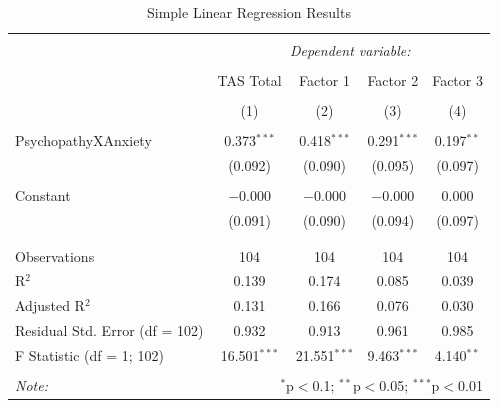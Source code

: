 \documentclass[
  man,floatsintext]{apa7}
\begin{document}
\begin{table}[!htbp] \centering 
  \caption{Simple Linear Regression Results} 
  \label{tab:simple-regression-output} 
\begin{tabular}{@{\extracolsep{1pt}}lcccc} 
\\[-1.8ex]\hline 
\hline \\[-1.8ex] 
 & \multicolumn{4}{c}{\textit{Dependent variable:}} \\ 
\cline{2-5} 
\\[-1.8ex] & TAS Total & Factor 1 & Factor 2 & Factor 3 \\ 
\\[-1.8ex] & (1) & (2) & (3) & (4)\\ 
\hline \\[-1.8ex] 
 PsychopathyXAnxiety & 0.373$^{***}$ & 0.418$^{***}$ & 0.291$^{***}$ & 0.197$^{**}$ \\ 
  & (0.092) & (0.090) & (0.095) & (0.097) \\ 
  & & & & \\ 
 Constant & $-$0.000 & $-$0.000 & $-$0.000 & 0.000 \\ 
  & (0.091) & (0.090) & (0.094) & (0.097) \\ 
  & & & & \\ 
\hline \\[-1.8ex] 
Observations & 104 & 104 & 104 & 104 \\ 
R$^{2}$ & 0.139 & 0.174 & 0.085 & 0.039 \\ 
Adjusted R$^{2}$ & 0.131 & 0.166 & 0.076 & 0.030 \\ 
Residual Std. Error (df = 102) & 0.932 & 0.913 & 0.961 & 0.985 \\ 
F Statistic (df = 1; 102) & 16.501$^{***}$ & 21.551$^{***}$ & 9.463$^{***}$ & 4.140$^{**}$ \\ 
\hline 
\hline \\[-1.8ex] 
\textit{Note:}  & \multicolumn{4}{r}{$^{*}$p$<$0.1; $^{**}$p$<$0.05; $^{***}$p$<$0.01} \\ 
\end{tabular} 
\end{table}
\end{document}
